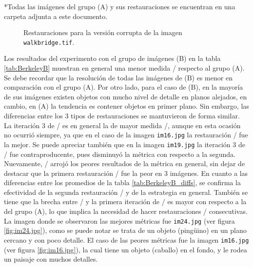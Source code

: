 \begin{scriptsize}
	*Todas las im\'agenes del grupo (A) y sus restauraciones se encuentran en una carpeta adjunta a este documento.
\end{scriptsize}

\begin{figure}[H]
	\centering
	\caption{Restauraciones para la versi\'on corrupta de la imagen \texttt{walkbridge.tif}.}
	\label{fig:walkbridge.tif}
\end{figure}


Los resultados del experimento con el grupo de im\'agenes (B) en la tabla \ref{tab:BerkeleyB} muestran en general una menor medida \PSNR/ respecto al grupo (A). Se debe recordar que la resoluci\'on de todas las im\'agenes de (B) es menor en comparaci\'on con el grupo (A). Por otro lado, para el caso de (B), en la mayor\'ia de sus im\'agenes existen objetos con mucho nivel de detalle en planos alejados, en cambio, en (A) la tendencia es contener objetos en primer plano. Sin embargo, las diferencias entre los 3 tipos de restauraciones se mantuvieron de forma similar. La iteraci\'on 3 de \SOP/ es en general la de mayor medida \PSNR/, aunque en esta ocasión no ocurrió siempre, ya que en el caso de la imagen \texttt{im16.jpg} la restauraci\'on \NS/ fue la mejor. Se puede apreciar tambi\'en que en la imagen \texttt{im19.jpg} la iteraci\'on 3 de \SOP/ fue contraproducente, pues disminuy\'o la métrica con respecto a la segunda. Nuevamente, \TELEA/ arroj\'o los peores resultados de la m\'etrica en general, sin dejar de destacar que la primera restauración \SOP/ fue la peor en 3 im\'agenes. En cuanto a las diferencias entre los promedios de la tabla \ref{tab:BerkeleyB_diffs}, se confirma la efectividad de la segunda restauraci\'on \SOP/ y de la estrategia en general. Tambi\'en se tiene que la brecha entre \NS/ y la primera iteraci\'on de \SOP/ es mayor con respecto a la del grupo (A), lo que implica la necesidad de hacer restauraciones \SOP/ consecutivas. La imagen donde se observaron las mejores m\'etricas fue \texttt{im24.jpg} (ver figura \ref{fig:im24.jpg}), como se puede notar se trata de un objeto (ping\"uino) en un plano cercano y con poco detalle. El caso de las peores m\'etricas fue la imagen \texttt{im16.jpg} (ver figura \ref{fig:im16.jpg}), la cual tiene un objeto (caballo) en el fondo, y le rodea un paisaje con muchos detalles.

